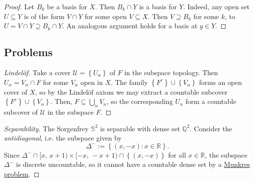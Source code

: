 \begin{proof}
    Let \( B_k \) be a basis for \( X \). Then \( B_k \cap Y \) is a basis for \( Y \). Indeed, any open set \( U \subseteq Y \) is of the form \( V \cap Y \) for some open \( V \subseteq X \). Then \( V \supseteq B_k \) for some \( k \), to \( U = V \cap Y \supseteq B_k \cap Y \). An analogous argument holds for a basis at \( y \in Y \).
\end{proof}

\subsection{Problems}


\begin{proof}[Lindel\"of]
    Take a cover \( \mathcal{U} = \left\{ U_\alpha \right\} \) of \( F \) in the subspace topology. Then \( U_\alpha = V_\alpha \cap F \) for some \( V_\alpha \) open in \( X \). The family \( \left\{ F^c \right\} \cup \left\{ V_\alpha \right\} \) forms an open cover of \( X \), so by the Lindel\"of axiom we may extract a countable subcover \( \left\{ F^c \right\} \cup \left\{ V_n \right\} \). Then, \( F \subseteq \bigcup_n V_n \), so the corresponding \( U_n \) form a countable subcover of \( \mathcal{U} \) in the subspace \( F \).
\end{proof}

\begin{proof}[Separability]
The Sorgenfrey \( \mathbb{S}^2 \) is separable with dense set \( \mathbb{Q}^2 \). Consider the \emph{antidiagonal}, i.e. the subspace given by
\[ 
    \Delta^- := \left\{ (x, -x) : x \in \mathbb{R} \right\}.
\]
Since \( \Delta^- \cap [x,\, x+1) \times [-x,\, -x + 1) \cap \left\{ (x,-x) \right\} \) for all \( x \in \mathbb{R} \), the subspace \( \Delta^- \) is discrete uncountable, so it cannot have a countable dense set by a \hyperlink{MunkresP30.13}{Munkres problem}.
\end{proof}



